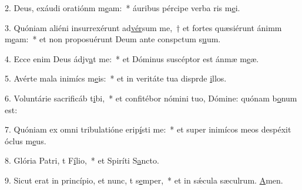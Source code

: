 2. Deus, exáudi oratiónm m\uline{e}am:~* áuribus pércipe verba ris m\uline{e}i.\par 
3. Quóniam aliéni insurrexérunt ad\uline{vér}sum me,~† et fortes quæsiérunt ánimm m\uline{e}am:~* et non proposuérunt Deum ante conspctum s\uline{u}um.\par 
4. Ecce enim Deus ádjv\uline{a}t me:~* et Dóminus suscéptor est ánmæ m\uline{e}æ.\par 
5. Avérte mala inimícs m\uline{e}is:~* et in veritáte tua disprde \uline{i}llos.\par 
6. Voluntárie sacrificáb t\uline{i}bi,~* et confitébor nómini tuo, Dómine: quónam b\uline{o}num est:\par 
7. Quóniam ex omni tribulatióne erip\uline{í}sti me:~* et super inimícos meos despéxit óclus m\uline{e}us.\par 
8. Glória Patri, t F\uline{í}lio,~* et Spiríti S\uline{a}ncto.\par 
9. Sicut erat in princípio, et nunc, t s\uline{e}mper,~* et in sǽcula sæculrum. \uline{A}men.\par 
